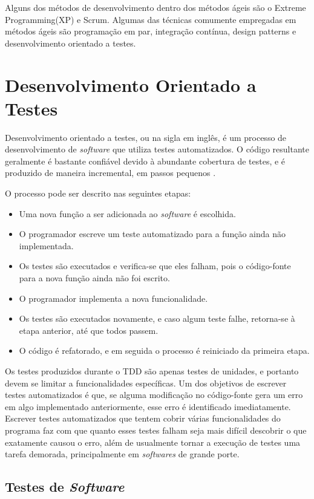 Alguns dos métodos de desenvolvimento dentro dos métodos ágeis são o Extreme Programming(XP) e Scrum. Algumas das técnicas comumente empregadas em métodos ágeis são programação em par, integração contínua, design patterns e desenvolvimento orientado a testes.

\section{Desenvolvimento Orientado a Testes}\label{fun:tdd}

Desenvolvimento orientado a testes, ou  na sigla em inglês, é um processo de desenvolvimento de \emph{software} que utiliza testes automatizados. O código resultante geralmente é bastante confiável devido à abundante cobertura de testes, e é produzido de maneira incremental, em passos pequenos \cite{beck2003}.

O processo pode ser descrito nas seguintes etapas:
\begin{itemize}
\item Uma nova função a ser adicionada ao \emph{software} é escolhida.
\item O programador escreve um teste automatizado para a função ainda não implementada.
\item Os testes são executados e verifica-se que eles falham, pois o código-fonte para a nova função ainda não foi escrito.
\item O programador implementa a nova funcionalidade.
\item Os testes são executados novamente, e caso algum teste falhe, retorna-se à etapa anterior, até que todos passem.
\item O código é refatorado, e em seguida o processo é reiniciado da primeira etapa.
\end{itemize}

Os testes produzidos durante o TDD são apenas testes de unidades, e portanto devem se limitar a funcionalidades específicas. Um dos objetivos de escrever testes automatizados é que, se alguma modificação no código-fonte gera um erro em algo implementado anteriormente, esse erro é identificado imediatamente. Escrever testes automatizados que tentem cobrir várias funcionalidades do programa faz com que quanto esses testes falham seja mais difícil descobrir o que exatamente causou o erro, além de usualmente tornar a execução de testes uma tarefa demorada, principalmente em \emph{softwares} de grande porte.

\subsection{Testes de \emph{Software}}

